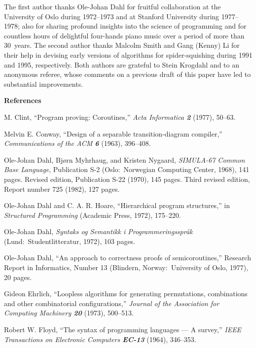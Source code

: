 The first author thanks Ole-Johan Dahl for fruitful
collaboration at the University of Oslo during 1972--1973 and
at Stanford University during 1977--1978; also for sharing
profound insights into the science of programming and for
countless hours of delightful four-hands piano music over a period of more
than 30~years.  The
second author thanks Malcolm Smith and Gang (Kenny) Li for
their help in devising early versions of algorithms
for spider-squishing during 1991 and 1995, respectively.
Both authors are grateful to Stein Krogdahl and to an anonymous referee,
whose comments on a previous draft of this paper have led to substantial
improvements.

\vfill\eject
\centerline{\bf References}

\bigskip\noindent
[\Clint] M. Clint, ``Program proving: Coroutines,'' {\sl Acta
Informatica\/ \bf2} (1977), 50--63.

\bigskip\noindent
[\Conway] Melvin E. Conway, ``Design of a separable transition-diagram
compiler,'' {\sl Communications of the ACM\/ \bf6} (1963), 396--408.

\bigskip\noindent
[\Sbase] Ole-Johan Dahl, Bj{\o}rn Myhrhaug, and Kristen Nygaard,
{\sl SIMULA-67 Common Base Language}, Publication S-2
(Oslo:\ Norwegian Computing Center, 1968), 141 pages. Revised
edition, Publication S-22 (1970), 145 pages. Third revised edition,
Report number 725 (1982), 127 pages.

\bigskip\noindent
[\SP] Ole-Johan Dahl and C. A. R. Hoare, ``Hierarchical program
structures,'' in {\sl Structured Programming\/} (Academic Press,
1972), 175--220.

\bigskip\noindent
[\Dsyn] Ole-Johan Dahl, {\sl Syntaks og Semantikk i
Programmeringsspr{\aa}k\/} (Lund:\ Student\-littera\-tur, 1972), 103 pages.

\bigskip\noindent
[\Dsemi] Ole-Johan Dahl, ``An approach to correctness proofs of
semicoroutines,'' Research Report in Informatics, Number 13 (Blindern,
Norway:\ University of Oslo, 1977), 20 pages.

\bigskip\noindent
[\Ehrlich] Gideon Ehrlich, ``Loopless algorithms for
generating permutations, combinations and other
combinatorial configurations,'' {\sl Journal of the
Association for Computing Machinery\/ \bf 20} (1973),
500--513.

\bigskip\noindent
[\Floyd] Robert W. Floyd, ``The syntax of programming languages --- A
survey,'' {\sl IEEE Transactions on Electronic Computers\/ \bf EC-13}
(1964), 346--353.

